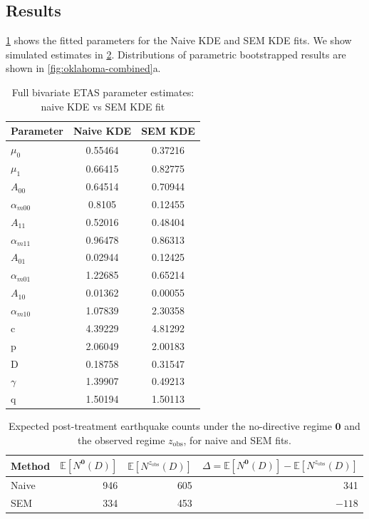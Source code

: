 \documentclass{statsoc}
\newcommand{\bbE}{\mathbb{E}}
\newcommand{\1}{\mathbbm{1}}
\newcommand{\Nproc}{N}
\begin{document}
\subsection{Results}

\cref{tab:fitted_params} shows the fitted parameters for the Naive KDE and SEM KDE fits. 
We show simulated estimates in \cref{tab:ok_counts}. Distributions of parametric bootstrapped results are shown in \cref{fig:oklahoma-combined}a.

\begin{table}
\caption{Full bivariate ETAS parameter estimates: naive KDE vs SEM KDE fit}
\label{tab:fitted_params}
\centering
\begin{minipage}{\textwidth}
\centering
\begin{tabular}{@{}lcc@{}}
\toprule
Parameter & Naive KDE & SEM KDE\\
\midrule
$\mu_0$ & 0.55464 & 0.37216\\
$\mu_1$ & 0.66415 & 0.82775\\
$A_{00}$ & 0.64514 & 0.70944\\
$\alpha_{m00}$ & 0.8105 & 0.12455\\
$A_{11}$ & 0.52016 & 0.48404\\
$\alpha_{m11}$ & 0.96478 & 0.86313\\
$A_{01}$ & 0.02944 & 0.12425\\
$\alpha_{m01}$ & 1.22685 & 0.65214\\
$A_{10}$ & 0.01362 & 0.00055\\
$\alpha_{m10}$ & 1.07839 & 2.30358\\
c & 4.39229 & 4.81292\\
p & 2.06049 & 2.00183\\
D & 0.18758 & 0.31547\\
$\gamma$ & 1.39907 & 0.49213\\
q & 1.50194 & 1.50113\\
\bottomrule
\end{tabular}
\vspace{0.5em}
\end{minipage}
\end{table}

\begin{table}
\caption{Expected post-treatment earthquake counts under the no-directive regime $\mathbf 0$ and the observed regime $z_{\mathrm{obs}}$, for naive and SEM fits.}
\label{tab:ok_counts}
\centering
\begin{minipage}{\textwidth}
\centering
\begin{tabular}{lrrr}
\toprule
Method 
& $\bbE[\Nproc^{\mathbf 0}(D)]$ 
& $\bbE[\Nproc^{z_{\mathrm{obs}}}(D)]$ 
& $\Delta = \bbE[\Nproc^{\mathbf 0}(D)] - \bbE[\Nproc^{z_{\mathrm{obs}}}(D)]$ \\
\midrule
Naive & 946 & 605 & 341 \\
SEM   & 334 & 453 & $-118$ \\
\bottomrule
\end{tabular}
\vspace{0.5em}
\end{minipage}
\end{table}
\end{document}
